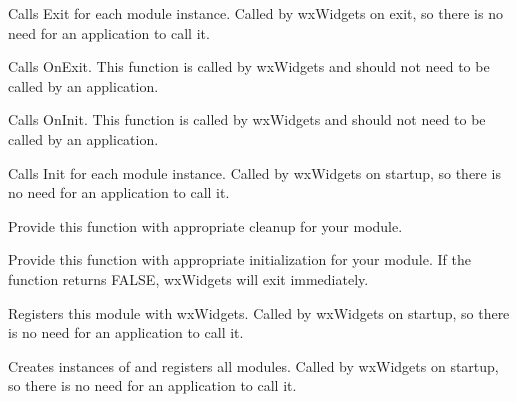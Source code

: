 
Calls Exit for each module instance. Called by wxWidgets on exit, so there is no
need for an application to call it.

\label{wxmoduleexit}


Calls OnExit. This function is called by wxWidgets and should not need to be called
by an application.

\label{wxmoduleinit}


Calls OnInit. This function is called by wxWidgets and should not need to be called
by an application.

\label{wxmoduleinitializemodules}


Calls Init for each module instance. Called by wxWidgets on startup, so there is no
need for an application to call it.

\label{wxmoduleonexit}


Provide this function with appropriate cleanup for your module.

\label{wxmoduleoninit}


Provide this function with appropriate initialization for your module. If the function
returns FALSE, wxWidgets will exit immediately.

\label{wxmoduleregistermodule}


Registers this module with wxWidgets. Called by wxWidgets on startup, so there is no
need for an application to call it.

\label{wxmoduleregistermodules}


Creates instances of and registers all modules. Called by wxWidgets on startup, so there is no
need for an application to call it.

